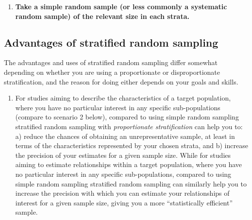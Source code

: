 \documentclass[
]{book}
\providecommand{\tightlist}{%
  \setlength{\itemsep}{0pt}\setlength{\parskip}{0pt}}
\begin{document}
\begin{enumerate}
\item
  \textbf{Take a simple random sample (or less commonly a systematic random sample) of the relevant size in each strata.}
\end{enumerate}

\hypertarget{advantages-of-stratified-random-sampling}{%
\subsection{Advantages of stratified random sampling}\label{advantages-of-stratified-random-sampling}}

The advantages and uses of stratified random sampling differ somewhat depending on whether you are using a proportionate or disproportionate stratification, and the reason for doing either depends on your goals and skills.

\begin{enumerate}
\def\labelenumi{\arabic{enumi}.}
\tightlist
\item
  For studies aiming to describe the characteristics of a target population, where you have no particular interest in any specific sub-populations (compare to scenario 2 below), compared to using simple random sampling stratified random sampling with \emph{proportionate stratification} can help you to: a) reduce the chances of obtaining an unrepresentative sample, at least in terms of the characteristics represented by your chosen strata, and b) increase the precision of your estimates for a given sample size. While for studies aiming to estimate relationships within a target population, where you have no particular interest in any specific sub-populations, compared to using simple random sampling stratified random sampling can similarly help you to increase the precision with which you can estimate your relationships of interest for a given sample size, giving you a more ``statistically efficient'' sample.
\end{enumerate}
\end{document}
